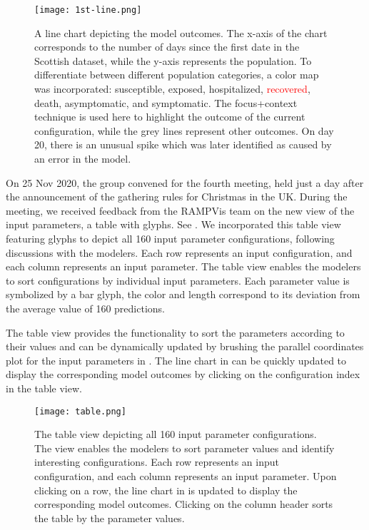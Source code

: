 \begin{figure}[tb!]
    \centering
    \texttt{[image: 1st-line.png]}
    \caption{A line chart depicting the model outcomes.
    The x-axis of the chart corresponds to the number of days since the first date in the Scottish dataset, while the y-axis represents the population.
    To differentiate between different population categories, a color map was incorporated: \textcolor{DodgerBlue1}{susceptible}, \textcolor{Chocolate1}{exposed}, \textcolor{Green4}{hospitalized}, \textcolor{red}{recovered}, \textcolor{DarkOrchid1}{death}, \textcolor{LightSalmon4}{asymptomatic}, and \textcolor{HotPink1}{symptomatic}.
    The focus+context technique is used here to highlight the outcome of the current configuration, while the grey lines represent other outcomes. On day 20, there is an unusual spike which was later identified as caused by an error in the model.
    }
    \label{fig:1st-line}

\end{figure}


On 25 Nov 2020, the group convened for the fourth meeting, held just a day after the announcement of the gathering rules for Christmas in the UK.
During the meeting, we received feedback from the RAMPVis team on the new view of the input parameters, a table with glyphs.
See .
We incorporated this table view featuring glyphs to depict all 160 input parameter configurations, following discussions with the modelers.
Each row represents an input configuration, and each column represents an input parameter.
The table view enables the modelers to sort configurations by individual input parameters.
Each parameter value is symbolized by a bar glyph, the color and length correspond to its deviation from the average value of 160 predictions.

The table view provides the functionality to sort the parameters according to their values and can be dynamically updated by brushing the parallel coordinates plot for the input parameters in .
The line chart in  can be quickly updated to display the corresponding model outcomes by clicking on the configuration index in the table view.

\begin{figure}[tb!]
    \centering
    \texttt{[image: table.png]}
    \caption{The table view depicting all 160 input parameter configurations.
    The view enables the modelers to sort parameter values and identify interesting configurations.
    Each row represents an input configuration, and each column represents an input parameter.
    Upon clicking on a row, the line chart in  is updated to display the corresponding model outcomes.
    Clicking on the column header sorts the table by the parameter values.
    }
    \label{fig:table-view}

\end{figure}

